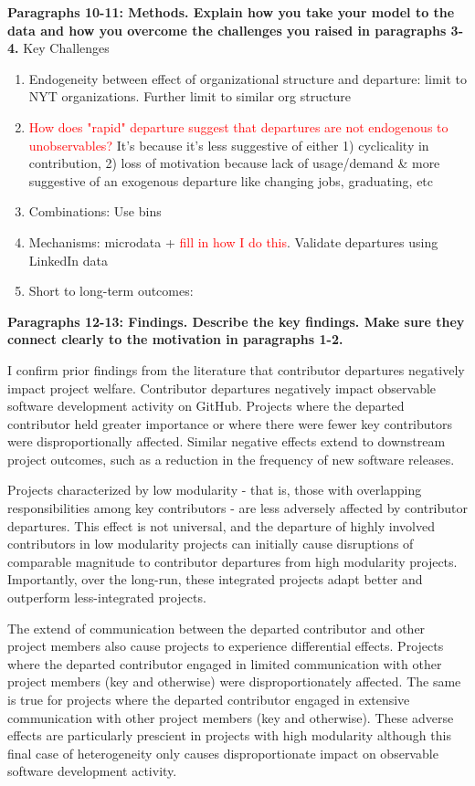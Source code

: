 \documentclass[source/paper/main.tex]{subfiles}
\begin{document}
\textbf{Paragraphs 10-11: Methods. Explain how you take your model to the data and how you overcome the challenges you raised in paragraphs 3-4.}
Key Challenges
\begin{enumerate}
    \item Endogeneity between effect of organizational structure and departure: limit to NYT organizations. Further limit to similar org structure 
    \item \textcolor{red}{How does "rapid" departure suggest that departures are not endogenous to unobservables? } It's because it's less suggestive of either 1) cyclicality in contribution, 2) loss of motivation because lack of usage/demand \& more suggestive of an exogenous departure like changing jobs, graduating, etc 
    \item Combinations: Use bins 
    \item Mechanisms: microdata + \textcolor{red}{fill in how I do this}. Validate departures using LinkedIn data
    \item Short to long-term outcomes: 
\end{enumerate}

\textbf{Paragraphs 12-13: Findings. Describe the key findings. Make sure they connect clearly to the motivation in paragraphs 1-2.}

I confirm prior findings from the literature that contributor departures negatively impact project welfare. Contributor departures negatively impact observable software development activity on GitHub. Projects where the departed contributor held greater importance or where there were fewer key contributors were disproportionally affected. Similar negative effects extend to downstream project outcomes, such as a reduction in the frequency of new software releases.

Projects characterized by low modularity - that is, those with overlapping responsibilities among key contributors - are less adversely affected by contributor departures. This effect is not universal, and the departure of highly involved contributors in low modularity projects can initially cause disruptions of comparable magnitude to contributor departures from high modularity projects. Importantly, over the long-run, these integrated projects adapt better and outperform less-integrated projects. 

The extend of communication between the departed contributor and other project members also cause projects to experience differential effects. Projects where the departed contributor engaged in limited communication with other project members (key and otherwise) were disproportionately affected. The same is true for projects where the departed contributor engaged in extensive communication with other project members (key and otherwise). These adverse effects are particularly prescient in projects with high modularity although this final case of heterogeneity only causes disproportionate impact on observable software development activity.
\end{document}
